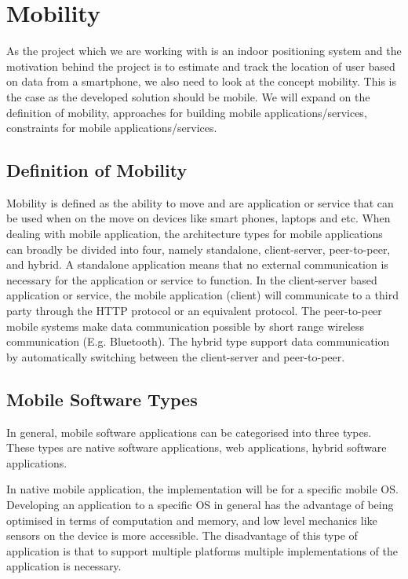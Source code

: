 \section{Mobility}
As the project which we are working with is an indoor positioning system and the motivation behind the project is to estimate and track the location of user based on data from a smartphone, we also need to look at the concept mobility. This is the case as the developed solution should be mobile. We will expand on the definition of mobility, approaches for building mobile applications/services, constraints for mobile applications/services. 

\subsection{Definition of Mobility}
Mobility is defined as the ability to move and are application or service that can be used when on the move on devices like smart phones, laptops and etc. When dealing with mobile application, the architecture types for mobile applications can broadly be divided into four, namely standalone, client-server, peer-to-peer, and hybrid. A standalone application means that no external communication is necessary for the application or service to function. In the client-server based application or service, the mobile application (client) will communicate to a third party through the HTTP protocol or an equivalent protocol. The peer-to-peer mobile systems make data communication possible by short range wireless communication (E.g. Bluetooth). The hybrid type support data communication by automatically switching between the client-server and peer-to-peer.

\subsection{Mobile Software Types}
In general, mobile software applications can be categorised into three types. These types are native software applications, web applications, hybrid software applications.\cite{mobileSoftwareTypes}

In native mobile application, the implementation will be for a specific mobile OS. Developing an application to a specific OS in general has the advantage of being optimised in terms of computation and memory, and low level mechanics like sensors on the device is more accessible. The disadvantage of this type of application is that to support multiple platforms multiple implementations of the application is necessary. 